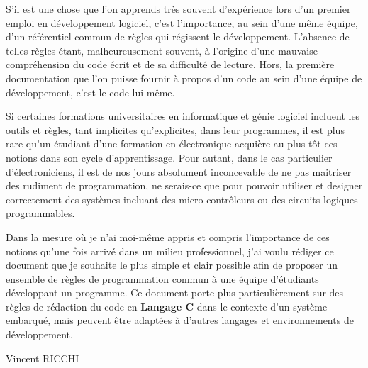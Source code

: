 

S'il est une chose que l'on apprends très souvent d'expérience lors d'un premier emploi en développement logiciel, c'est l'importance, au sein d'une même équipe, d'un référentiel commun de règles qui régissent le développement. L'absence de telles règles étant, malheureusement souvent, à l'origine d'une mauvaise compréhension du code écrit et de sa difficulté de lecture. Hors, la première documentation que l'on puisse fournir à propos d'un code au sein d'une équipe de développement, c'est le code lui-même.\bigskip

Si certaines formations universitaires en informatique et génie logiciel incluent les outils et règles, tant implicites qu'explicites, dans leur programmes, il est plus rare qu'un étudiant d'une formation en électronique acquière au plus tôt ces notions dans son cycle d'apprentissage. Pour autant, dans le cas particulier d'électroniciens, il est de nos jours absolument inconcevable de ne pas maitriser des rudiment de programmation, ne serais-ce que pour pouvoir utiliser et designer correctement des systèmes incluant des micro-contrôleurs ou des circuits logiques programmables.\bigskip

Dans la mesure où je n'ai moi-même appris et compris l'importance de ces notions qu'une fois arrivé dans un milieu professionnel, j'ai voulu rédiger ce document que je souhaite le plus simple et clair possible afin de proposer un ensemble de règles de programmation commun à une équipe d'étudiants développant un programme. Ce document porte plus particulièrement sur des règles de rédaction du code en \textbf{Langage C} dans le contexte d'un système embarqué, mais peuvent être adaptées à d'autres langages et environnements de développement.\bigskip

\begin{flushright}
Vincent RICCHI
\end{flushright}

\pagebreak
